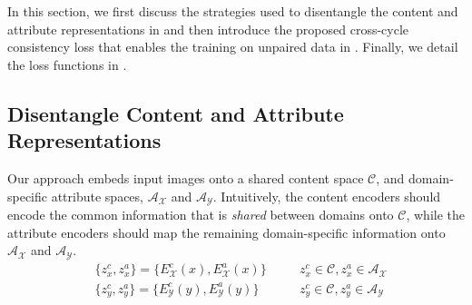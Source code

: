 \documentclass[runningheads]{llncs}
\begin{document}
In this section, we first discuss the strategies used to disentangle the content and attribute representations in  and then introduce the proposed cross-cycle consistency loss that enables the training on unpaired data in . 
%
Finally, we detail the loss functions in .

\subsection{Disentangle Content and Attribute Representations}
\label{subsec:conadv}
\vspace{\subsecmargin}
%
Our approach embeds input images onto a shared content space $\mathcal{C}$, and domain-specific attribute spaces, $\mathcal{A}_\mathcal{X}$ and $\mathcal{A}_\mathcal{Y}$.
%
Intuitively, the content encoders should encode the common information that is \emph{shared} between domains onto $\mathcal{C}$, while the attribute encoders should map the remaining domain-specific information onto $\mathcal{A}_\mathcal{X}$ and $\mathcal{A}_\mathcal{Y}$.
%
\vspace{\eqmargin}
\begin{equation}
\begin{aligned}
&\{z_x^{c},z_x^{a}\} = \{{E^c_\mathcal{X}}(x), {E^a_\mathcal{X}}(x)\}\quad&& z_x^{c}\in \mathcal{C}, z_x^{a}\in \mathcal{A}_\mathcal{X}\\
&\{z_y^{c},z_y^{a}\} = \{{E^c_\mathcal{Y}}(y), {E^a_\mathcal{Y}}(y)\}\quad&& z_y^{c}\in \mathcal{C}, z_y^{a}\in \mathcal{A}_\mathcal{Y}
\end{aligned}
\end{equation}
\vspace{\eqmargin}
%
\end{document}
